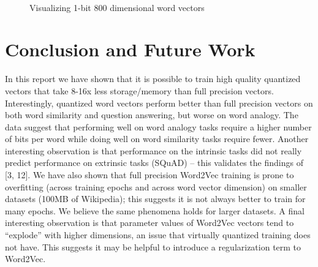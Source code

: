\documentclass{article} %
\begin{document}
\begin{figure}
    \\
    \qquad
    \caption{Visualizing 1-bit 800 dimensional word vectors}
    \label{fig:viz}
\end{figure}

\section{Conclusion and Future Work}

In this report we have shown that it is possible to train high quality
quantized vectors that take 8-16x less storage/memory than full
precision vectors. Interestingly, quantized word vectors perform
better than full precision vectors on both word similarity and
question answering, but worse on word analogy. The data suggest that
performing well on word analogy tasks require a higher number of bits
per word while doing well on word similarity tasks require
fewer. Another interesting observation is that performance on the
intrinsic tasks did not really predict performance on extrinsic tasks
(SQuAD) -- this validates the findings of [3, 12]. We  have also shown
that full precision Word2Vec training is prone to overfitting (across
training epochs and across word vector dimension) on smaller datasets
(100MB of Wikipedia); this suggests it is not always better to train
for many epochs. We believe the same phenomena holds for larger
datasets. A final interesting observation is that parameter values of
Word2Vec vectors tend to ``explode'' with higher dimensions, an issue
that virtually quantized training does not have. This suggests it may
be helpful to introduce a regularization term to Word2Vec.
\end{document}
